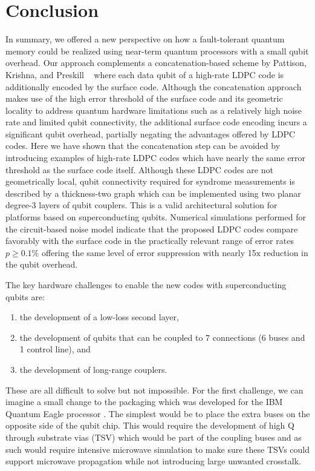 \documentclass{article}
\begin{document}
\newcommand{\maindocument}{}


\section{Conclusion}
\label{sec:conclusions}

In summary, we offered a new perspective on how a fault-tolerant quantum memory 
could be realized using  near-term quantum processors with a small qubit overhead.
Our approach complements a concatenation-based scheme by 
Pattison,  Krishna, and Preskill
~\cite{pattison2023hierarchical}
where each data qubit of a high-rate  LDPC code is additionally encoded by the surface code.
 Although the  concatenation approach makes use of the high error threshold of the surface code and its geometric locality to address quantum
hardware  limitations such as  a relatively high noise rate and  limited qubit connectivity,
 the additional surface code encoding incurs a significant qubit overhead,
partially negating the advantages offered by LDPC codes. 
Here we have shown that the concatenation step can be avoided by introducing examples of high-rate LDPC codes which have nearly the same error threshold as the surface code itself. 
Although these LDPC codes are not geometrically local, qubit connectivity required for 
syndrome measurements is described by a thickness-two graph which can be implemented
using two planar degree-3 layers of qubit couplers. 
 This is a valid architectural solution for platforms based on superconducting qubits. Numerical simulations performed for the circuit-based noise model
indicate that the proposed LDPC codes compare favorably with the surface code
in the practically relevant range of error rates $p\ge 0.1\%$ 
offering the same level of error suppression with nearly 15$\text{x}$ reduction in the
qubit overhead.


The key hardware challenges to enable the new codes with superconducting qubits are:
\begin{enumerate}
    \item the development of a low-loss second layer,
    \item the development of qubits that can be coupled to 7 connections (6 buses and 1 control line), and
    \item the development of long-range couplers.
\end{enumerate} 

These are all difficult to solve but not impossible. For the first challenge, we can imagine a small change to the packaging \cite{bravyi2022future} which was developed for the IBM Quantum Eagle processor \cite{chow2021}. The simplest would be to place the extra buses on the opposite side of the qubit chip. This would require the development of high Q through substrate vias (TSV) which would be part of the coupling buses and as such would require intensive microwave simulation to make sure these TSVs could support microwave propagation while not introducing large unwanted crosstalk.
\end{document}
